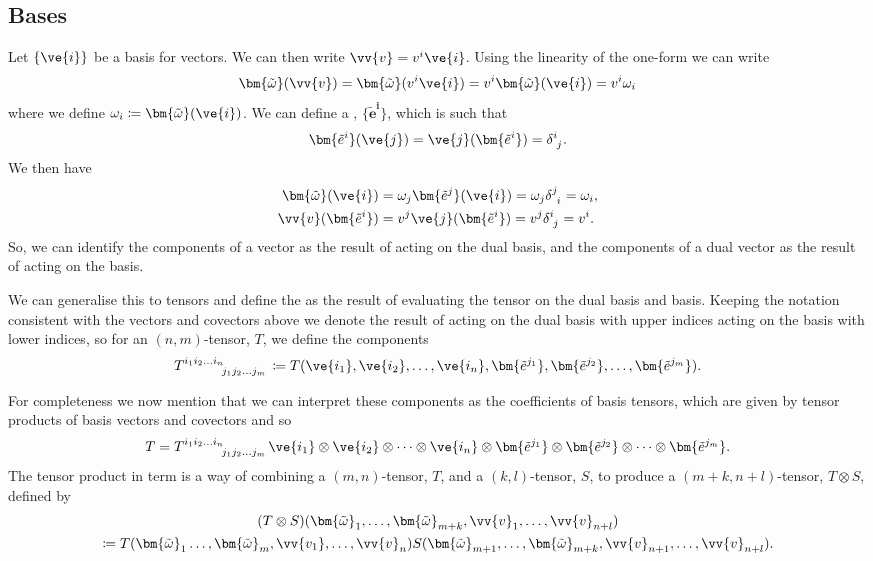 \documentclass[fleqn]{NotesClass}
\newcommand*{\cv}[1]{\bm{\tilde{#1}}}
\newcommand*{\cve}[1]{\bm{\tilde{e}^{#1}}}
\begin{document}
    \subsection{Bases}
    Let \(\{\ve{i}\}\) be a basis for vectors.
    We can then write \(\vv{v} = v^i\ve{i}\).
    Using the linearity of the one-form we can write
    \begin{equation}
        \cv{\omega}(\vv{v}) = \cv{\omega}(v^i\ve{i}) = v^i\cv{\omega}(\ve{i}) = v^i\omega_i
    \end{equation}
    where we define \(\omega_i \coloneqq \cv{\omega}(\ve{i})\).
    We can define a , \(\{\cve{i}\}\), which is such that
    \begin{equation}
        \cve{i}(\ve{j}) = \ve{j}(\cve{i}) = \tensor{\delta}{^i_j}.
    \end{equation}
    We then have
    \begin{align}
        \cv{\omega}(\ve{i}) &= \omega_j\cve{j}(\ve{i}) = \omega_j\tensor{\delta}{^j_i} = \omega_i,\\
        \vv{v}(\cve{i}) &= v^j\ve{j}(\cve{i}) = v^j\tensor{\delta}{^i_j} = v^i.
    \end{align}
    So, we can identify the components of a vector as the result of acting on the dual basis, and the components of a dual vector as the result of acting on the basis.
    
    We can generalise this to tensors and define the  as the result of evaluating the tensor on the dual basis and basis.
    Keeping the notation consistent with the vectors and covectors above we denote the result of acting on the dual basis with upper indices acting on the basis with lower indices, so for an \((n, m)\)-tensor, \(T\), we define the components
    \begin{equation}
        \tensor{T}{^{i_1i_2\dotso i_n}_{j_1j_2\dotso j_m}} \coloneqq T(\ve{i_1}, \ve{i_2}, \dotsc, \ve{i_n}, \cve{j_1}, \cve{j_2}, \dotsc, \cve{j_m}).
    \end{equation}
    
    For completeness we now mention that we can interpret these components as the coefficients of basis tensors, which are given by tensor products of basis vectors and covectors and so
    \begin{equation}
        T = \tensor{T}{^{i_1i_2\dotso i_n}_{j_1j_2\dotso j_m}} \ve{i_1} \otimes \ve{i_2} \otimes \dotsb \otimes \ve{i_n} \otimes \cve{j_1} \otimes \cve{j_2} \otimes \dotsb \otimes \cve{j_m}.
    \end{equation}
    The tensor product in term is a way of combining a \((m, n)\)-tensor, \(T\), and a \((k, l)\)-tensor, \(S\), to produce a \((m + k, n + l)\)-tensor, \(T \otimes S\), defined by
    \begin{multline}
        (T\otimes S) (\cv{\omega}_1, \dotsc, \cv{\omega}_{m + k}, \vv{v}_1, \dotsc, \vv{v}_{n + l})\\
        \coloneqq T(\cv{\omega}_1 \dotsc, \cv{\omega}_{m}, \vv{v_1}, \dotsc, \vv{v}_n) S(\cv{\omega}_{m + 1}, \dotsc, \cv{\omega}_{m + k}, \vv{v}_{n + 1}, \dotsc, \vv{v}_{n + l}).
    \end{multline}
    
\end{document}
